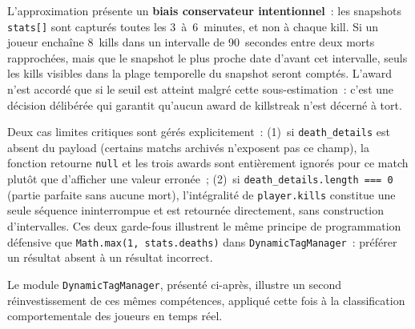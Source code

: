\documentclass[12pt,a4paper]{article}
\begin{document}
L'approximation présente un \textbf{biais conservateur intentionnel}~: les snapshots \texttt{stats[]} sont capturés toutes les 3~à~6~minutes, et non à chaque kill. Si un joueur enchaîne 8~kills dans un intervalle de 90~secondes entre deux morts rapprochées, mais que le snapshot le plus proche date d'avant cet intervalle, seuls les kills visibles dans la plage temporelle du snapshot seront comptés. L'award n'est accordé que si le seuil est atteint malgré cette sous-estimation~: c'est une décision délibérée qui garantit qu'aucun award de killstreak n'est décerné à tort.

Deux cas limites critiques sont gérés explicitement~: (1)~si \texttt{death\_details} est absent du payload (certains matchs archivés n'exposent pas ce champ), la fonction retourne \texttt{null} et les trois awards sont entièrement ignorés pour ce match plutôt que d'afficher une valeur erronée~; (2)~si \texttt{death\_details.length === 0} (partie parfaite sans aucune mort), l'intégralité de \texttt{player.kills} constitue une seule séquence ininterrompue et est retournée directement, sans construction d'intervalles. Ces deux garde-fous illustrent le même principe de programmation défensive que \texttt{Math.max(1, stats.deaths)} dans \texttt{DynamicTagManager}~: préférer un résultat absent à un résultat incorrect.

\bigskip

Le module \texttt{DynamicTagManager}, présenté ci-après, illustre un second réinvestissement de ces mêmes compétences, appliqué cette fois à la classification comportementale des joueurs en temps réel.
\end{document}
